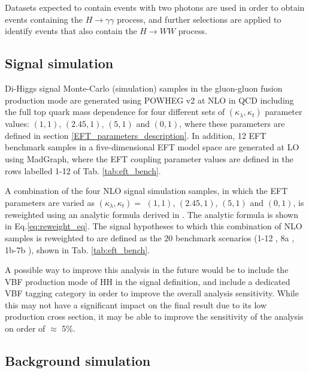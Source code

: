 Datasets expected to contain events with two photons are used in order to obtain events containing the $H\rightarrow\gamma\gamma$ process,
and further selections are applied to identify events that also contain the $H\rightarrow WW$ process. 

\subsection{Signal simulation} \label{sec:signal_simulation}

Di-Higgs signal Monte-Carlo (simulation) samples in the gluon-gluon fusion production mode are generated using POWHEG v2 \cite{Nason:2004rx, Frixione:2007vw, Alioli:2010xd, Heinrich:2019bkc}
at NLO in QCD including the full top quark mass dependence
for four different sets of $(\kappa_{\lambda}, \kappa_{t})$ parameter values: $(1, 1)$, $(2.45, 1)$, $(5, 1)$ and $(0, 1)$, where these parameters are defined in section \ref{EFT_parameters_description}. 
In addition, 12 EFT benchmark samples in a five-dimensional EFT model space are generated at LO \cite{Carvalho:2015ttv} using MadGraph, where the EFT coupling parameter values are defined in the rows labelled 
1-12 of Tab. \ref{tab:eft_bench}.   

A combination of the four NLO signal simulation samples, in which the EFT parameters are varied as $(\kappa_{\lambda}, \kappa_{t}) = $ $(1, 1)$, $(2.45, 1)$, $(5, 1)$ and $(0, 1)$, is reweighted using an analytic formula derived in \cite{Carvalho:2016rys,Buchalla:2018yce}. The analytic formula is shown in Eq.\ref{eq:reweight_eq}. 
The signal hypotheses to which this combination of NLO samples is reweighted to are defined as the 20 benchmark scenarios (1-12 \cite{Carvalho:2015ttv}, 8a \cite{Buchalla:2018yce}, 1b-7b \cite{Capozi:2019xsi}), shown in Tab. \ref{tab:eft_bench}. 

A possible way to improve this analysis in the future would be to include the VBF production mode of HH in the signal definition, and include a dedicated VBF tagging category in order to improve the overall analysis sensitivity. While this may not have a significant impact on the final result due to its low production cross section, it may be able to improve the sensitivity of the analysis on order of $\approx$ 5\%. 

\subsection{Background simulation} \label{sec:background_simulation}

